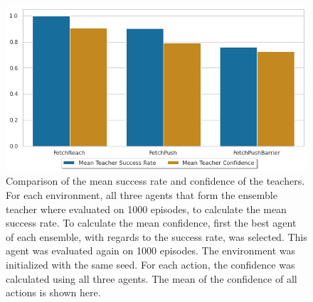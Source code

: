 \begin{figure}
    \centering
    \includegraphics[width=\textwidth]{images/results/ensemble_combined_bar.png}
    \caption[Comparison of the mean success rate and confidence of the teachers.]{Comparison of the mean success rate and confidence of the teachers. For each environment, all three agents that form the ensemble teacher where evaluated on 1000 episodes, to calculate the mean success rate. To calculate the mean confidence, first the best agent of each ensemble, with regards to the success rate, was selected. This agent was evaluated again on 1000 episodes. The environment was initialized with the same seed. For each action, the confidence was calculated using all three agents. The mean of the confidence of all actions is shown here.}
    \label{fig:results:barrier-drq-ensemble-bar}
\end{figure}